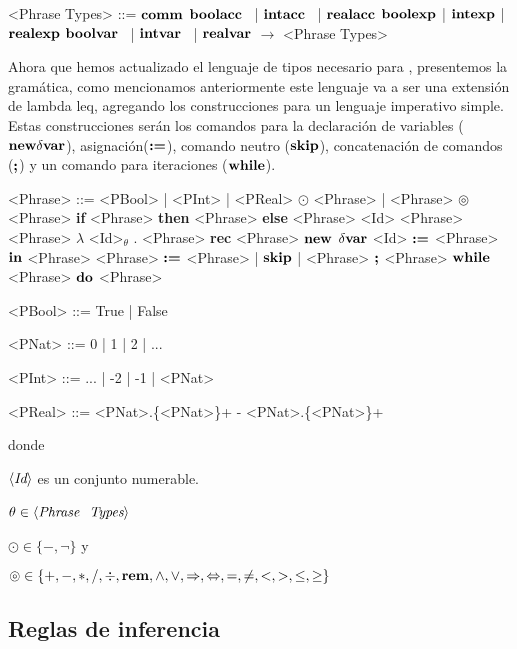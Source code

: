 \setlength{\grammarindent}{8em}
\begin{grammar}

<Phrase Types> ::= $\textbf{comm}$
\alt $\textbf{boolacc}$ \ | $\textbf{intacc}$ \ | $\textbf{realacc}$
\alt $\textbf{boolexp}$ | $\textbf{intexp}$ | $\textbf{realexp}$
\alt $\textbf{boolvar}$ \ | $\textbf{intvar}$ \ | $\textbf{realvar}$
 $\rightarrow$ <Phrase Types>

\end{grammar}

Ahora que hemos actualizado el lenguaje de tipos necesario para \Alike, presentemos
la gram\'atica, como mencionamos anteriormente este lenguaje va a ser una extensi\'on de lambda leq, agregando los construcciones para un lenguaje imperativo simple. Estas construcciones 
ser\'an los comandos para la declaraci\'on de variables ($\textbf{new} \delta \textbf{var}$), 
asignaci\'on($\textbf{:=}$), comando neutro ($\textbf{skip}$), concatenaci\'on de comandos ($\textbf{;}$)
y un comando para iteraciones ($\textbf{while}$).

\setlength{\grammarindent}{6em}
\begin{grammar}

<Phrase> ::= <PBool> | <PInt> | <PReal>
\alt $\odot$ <Phrase> | <Phrase> $\circledcirc$ <Phrase>
\alt \textbf{if} <Phrase> \textbf{then} <Phrase> \textbf{else} <Phrase>
\alt <Id> 
\alt <Phrase> <Phrase>
\alt $\lambda$ <Id>$_\theta$ . <Phrase>
\alt \textbf{rec} <Phrase>
\alt $\textbf{new}$ $\delta \textbf{var}$ <Id> $\textbf{:=}$ <Phrase> $\textbf{in}$ <Phrase>
\alt <Phrase> $\textbf{:=}$ <Phrase> | $\textbf{skip}$ | <Phrase> $\textbf{;}$ <Phrase>
\alt $\textbf{while}$ <Phrase> $\textbf{do}$ <Phrase>


<PBool> ::= True | False

<PNat>  ::= 0 | 1 | 2 | ...

<PInt>  ::= ... | -2 | -1 | <PNat> 

<PReal> ::= <PNat>.\{<PNat>\}+ 
\alt - <PNat>.\{<PNat>\}+

\end{grammar}

\noindent
donde \ 

$\langle \textit{Id} \rangle$ es un conjunto numerable.

$\theta \in \langle \textit{Phrase \ Types} \rangle$ \

$\odot \in \{-, \neg\}$ y \

$\circledcirc \in \{+,-,*,/,\div,\textbf{rem},\wedge,\vee,\Rightarrow,\Leftrightarrow, =,\neq,<,>,\leq,\geq\}$

\subsection{Reglas de inferencia}

